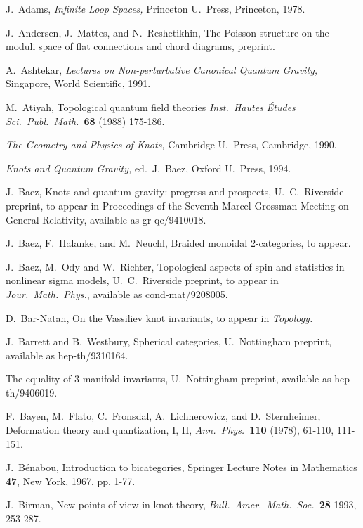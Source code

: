 \begin{thebibliography}{10}

 J.\ Adams, {\sl Infinite Loop Spaces,} Princeton
U.\ Press, Princeton, 1978.

 J.\ Andersen, J.\ Mattes, and N.\ Reshetikhin,
The Poisson structure on the moduli space of flat connections and chord
diagrams, preprint.

 A.\ Ashtekar, {\sl Lectures on Non-perturbative
Canonical Quantum Gravity,} Singapore, World Scientific, 1991.

  M.\ Atiyah, Topological quantum field theories
{\sl Inst.\ Hautes \'Etudes Sci.\ Publ.\ Math.\ }{\bf 68} (1988) 175-186.

{\sl The Geometry and Physics of Knots,}
Cambridge U.\ Press, Cambridge, 1990.

 {\sl Knots and Quantum Gravity,} ed.\ J.\
Baez, Oxford U.\ Press, 1994.

 J.\ Baez, Knots and quantum gravity: progress
and prospects, U.\ C.\ Riverside preprint, to
appear in Proceedings of the Seventh Marcel Grossman Meeting on
General Relativity, available as gr-qc/9410018.

 J.\ Baez, F.\ Halanke, and M.\ Neuchl, Braided
monoidal 2-categories, to appear.

 J.\ Baez, M.\ Ody and W.\ Richter, Topological
aspects of spin and statistics in nonlinear sigma models,
U.\ C.\ Riverside preprint, to appear in {\sl
Jour.\ Math.\ Phys.}, available as cond-mat/9208005.

 D.\ Bar-Natan, On the Vassiliev knot invariants,
to appear in {\sl Topology.}

 J.\ Barrett and B.\ Westbury, Spherical categories,
U.\ Nottingham preprint, available as hep-th/9310164.

The equality of 3-manifold invariants, U.\ Nottingham preprint, available as
hep-th/9406019.

 F.\ Bayen, M.\ Flato, C.\ Fronsdal, A.\
Lichnerowicz, and D.\ Sternheimer, Deformation theory and
quantization, I, II, {\sl Ann.\ Phys.\ }{\bf 110} (1978), 61-110,
111-151.

 J.\ B\'enabou, Introduction to bicategories,
Springer Lecture Notes in Mathematics {\bf 47}, New York, 1967, pp. 1-77.

\bibitem{Birman} J.\ Birman, New points of view in knot theory, {\sl
Bull.\ Amer.\ Math.\ Soc.\ }{\bf 28} 1993, 253-287.


\end{thebibliography}

